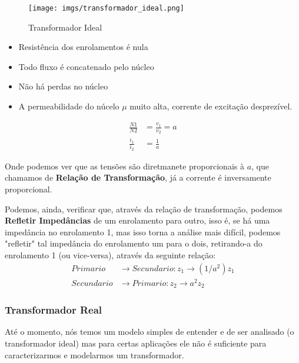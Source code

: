 \documentclass{article}
\begin{document}
\begin{figure}[h]
    \centering
    \texttt{[image: imgs/transformador\_ideal.png]}
    \caption{Transformador Ideal}
    \label{fig:transformador_ideal}
\end{figure}

\vspace{10px}
\begin{minipage}{0.5\textwidth}
\begin{itemize}
    \item  Resistência dos enrolamentos é nula
    \item Todo fluxo é concatenado pelo núcleo
    \item Não há perdas no núcleo
    \item A permeabilidade do núcelo $\mu$ muito alta, corrente de excitação desprezível.
\end{itemize}
\end{minipage}
\begin{minipage}{0.5\textwidth}
    \begin{align}
        \frac{N1}{N2} &= \frac{v_1}{v_2} = a \label{eq:tens_transformador}\\ 
        \frac{i_1}{i_2} &= \frac{1}{a}
    \end{align}
\end{minipage}
\vspace{10px}

Onde podemos ver que as tensões são diretmanete proporcionais à $a$, que chamamos de \textbf{Relação de Transformação}, já a corrente é inversamente proporcional.

Podemos, ainda, verificar que, através da relação de transformação, podemos \textbf{Refletir Impedâncias} de um enrolamento para outro, isso é, se há uma impedância no enrolamento 1, mas isso torna a análise mais difícil, podemos "refletir" tal impedância do enrolamento um para o dois, retirando-a do enrolamento 1 (ou vice-versa), através da seguinte relação:
\begin{align}
    Primario&\rightarrow Secundario: z_1 \rightarrow (1/a^2)z_1\\
    Secundario&\rightarrow Primario: z_2 \rightarrow a^2z_2
\end{align}

\subsubsection{Transformador Real}
Até o momento, nós temos um modelo simples de entender e de ser analisado (o transformador ideal) mas para certas aplicações ele não é suficiente para caracterizarmos e modelarmos um transformador.
\end{document}
